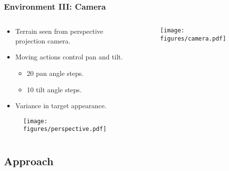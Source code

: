 \begin{frame}
    \frametitle{Environment III: Camera}
    \begin{columns}
        \begin{column}{0.5\textwidth}
            \begin{itemize}
                \item Terrain seen from perspective projection camera.
                \item Moving actions control pan and tilt.
                \begin{itemize}
                    \item 20 pan angle steps.
                    \item 10 tilt angle steps.
                \end{itemize}
                \item Variance in target appearance.

            \end{itemize}

            \begin{figure}
                \centering
                \texttt{[image: figures/perspective.pdf]}
            \end{figure}
        \end{column}
        \begin{column}{0.5\textwidth}
            \begin{figure}
                \centering
                \texttt{[image: figures/camera.pdf]}
            \end{figure}
        \end{column}
    \end{columns}
\end{frame}

\subsection{Approach}


